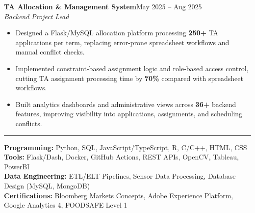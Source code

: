 \documentclass[10pt,letterpaper]{article}
\newenvironment{resumeItems}{
  \begin{itemize}
    \raggedright
    \setlength{\leftmargin}{1.15em}
    \setlength{\topsep}{0pt}
    \setlength{\itemsep}{0pt}
    \setlength{\parsep}{0pt}
    \setlength{\partopsep}{0pt}
}{
  \end{itemize}
  \vspace{-5pt}
}
\newcommand{\sectionTitle}[1]{
  \vspace{3pt}
  \noindent{\normalsize\bfseries #1}\par
  \vspace{2pt}
  \hrule
  \vspace{3pt}
}
\newcommand{\project}[3]{
  \textbf{#1}\hfill #3\\[0pt]
  \textit{#2}
}
\begin{document}
\project{TA Allocation \& Management System}{Backend Project Lead}{May 2025 -- Aug 2025}
\begin{resumeItems}
  \item Designed a Flask/MySQL allocation platform processing \textbf{250+} TA applications per term, replacing error-prone spreadsheet workflows and manual conflict checks.
  \item Implemented constraint-based assignment logic and role-based access control, cutting TA assignment processing time by \textbf{70\%} compared with spreadsheet workflows.
  \item Built analytics dashboards and administrative views across \textbf{36+} backend features, improving visibility into applications, assignments, and scheduling conflicts.
\end{resumeItems}

\sectionTitle{Skills}
\textbf{Programming:} Python, SQL, JavaScript/TypeScript, R, C/C++, HTML, CSS \\
\textbf{Tools:} Flask/Dash, Docker, GitHub Actions, REST APIs, OpenCV, Tableau, PowerBI \\
\textbf{Data Engineering:} ETL/ELT Pipelines, Sensor Data Processing, Database Design (MySQL, MongoDB) \\
\textbf{Certifications:} Bloomberg Markets Concepts, Adobe Experience Platform, Google Analytics 4, FOODSAFE Level 1
\end{document}
